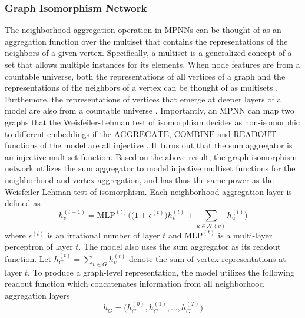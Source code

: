\documentclass[twoside,11pt]{article}
\begin{document}
\subsubsection{Graph Isomorphism Network}
The neighborhood aggregation operation in MPNNs can be thought of as an aggregation function over the multiset that contains the representations of the neighbors of a given vertex. 
Specifically, a multiset is a generalized concept of a set that allows multiple instances for its elements.
When node features are from a countable universe, both the representations of all vertices of a graph and the representations of the neighbors of a vertex can be thought of as multisets .
Furthemore, the representations of vertices that emerge at deeper layers of a model are also from a countable universe .
Importantly, an MPNN can map two graphs that the Weisfeiler-Lehman test of isomorphism decides as non-isomorphic to different embeddings if the $\text{AGGREGATE}$, $\text{COMBINE}$ and $\text{READOUT}$ functions of the model are all injective .
It turns out that the sum aggregator is an injective multiset function.
Based on the above result, the graph isomorphism network utilizes the sum aggregator to model injective multiset functions for the neighborhood and vertex aggregation, and has thus the same power as the Weisfeiler-Lehman test of isomorphism.
Each neighborhood aggregation layer is defined as
\begin{equation}
    h_v^{(t+1)} = \text{MLP}^{(t)} \Big( \big( 1 + \epsilon^{(t)} \big) h_v^{(t)} + \sum_{u \in \mathcal{N}(v)} h_u^{(t)} \Big)
\end{equation}
where $\epsilon^{(t)}$ is an irrational number of layer $t$ and $\text{MLP}^{(t)}$ is a multi-layer perceptron of layer $t$.
The model also uses the sum aggregator as its readout function.
Let $h_G^{(t)} = \sum_{v \in G} h_v^{(t)}$ denote the sum of vertex representations at layer $t$.
To produce a graph-level representation, the model utilizes the following readout function which concatenates information from all neighborhood aggregation layers
\begin{equation}
    h_G = \Big( h_G^{(0)}, h_G^{(1)}, \ldots, h_G^{(T)} \Big)
\end{equation}
\end{document}
